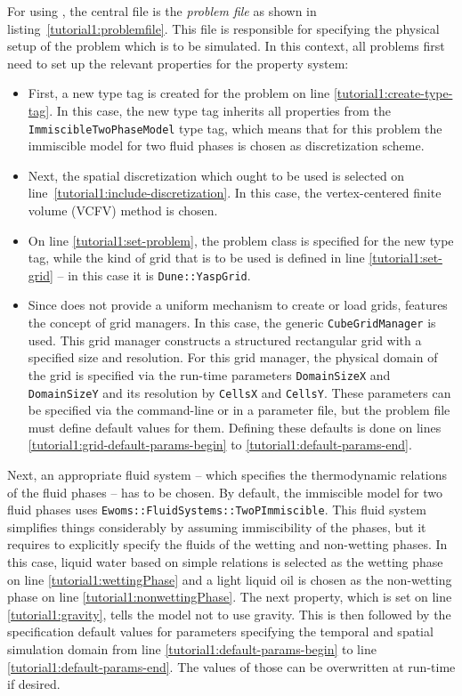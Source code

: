 For using \eWoms, the central file is the \emph{problem file} as
shown in listing~\ref{tutorial1:problemfile}. This file is responsible
for specifying the physical setup of the problem which is to be
simulated. In this context, all problems first need to set up the
relevant properties for the \eWoms property system:
\begin{itemize}
\item First, a new type tag is created for the problem on line
  \ref{tutorial1:create-type-tag}.  In this case, the new type
  tag inherits all properties from the \texttt{ImmiscibleTwoPhaseModel}
  type tag, which means that for this problem the immiscible model
  for two fluid phases is chosen as discretization scheme.
\item Next, the spatial discretization which ought to be used is
  selected on line~\ref{tutorial1:include-discretization}. In this
  case, the vertex-centered finite volume (VCFV) method is chosen.
\item On line \ref{tutorial1:set-problem}, the problem class is
  specified for the new type tag, while the kind of grid that is to be
  used is defined in line \ref{tutorial1:set-grid} -- in this case
  it is \texttt{Dune::YaspGrid}.
\item Since \Dune does not provide a uniform mechanism to create or
  load grids, \eWoms features the concept of grid managers. In this
  case, the generic \texttt{CubeGridManager} is used. This grid
  manager constructs a structured rectangular grid with a specified
  size and resolution. For this grid manager, the physical domain of
  the grid is specified via the run-time parameters
  \texttt{DomainSizeX} and \texttt{DomainSizeY} and its resolution by
  \texttt{CellsX} and \texttt{CellsY}. These parameters can be
  specified via the command-line or in a parameter file, but the
  problem file must define default values for them. Defining these
  defaults is done on lines \ref{tutorial1:grid-default-params-begin}
  to \ref{tutorial1:default-params-end}.
\end{itemize}

Next, an appropriate fluid system -- which specifies the thermodynamic
relations of the fluid phases -- has to be chosen. By default, the
immiscible model for two fluid phases uses
\texttt{\justifyNoHyphen{}Ewoms::Fluid\-Systems::TwoPImmiscible}. This
fluid system simplifies things considerably by assuming immiscibility
of the phases, but it requires to explicitly specify the fluids of the
wetting and non-wetting phases. In this case, liquid water based on
simple relations is selected as the wetting phase on line
\ref{tutorial1:wettingPhase} and a light liquid oil is chosen as the
non-wetting phase on line \ref{tutorial1:nonwettingPhase}. The next
property, which is set on line \ref{tutorial1:gravity}, tells the
model not to use gravity. This is then followed by the specification
default values for parameters specifying the temporal and spatial
simulation domain from line \ref{tutorial1:default-params-begin} to
line \ref{tutorial1:default-params-end}. The values of those can be
overwritten at run-time if desired.


